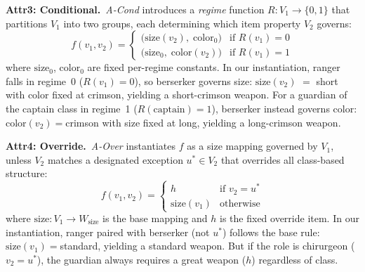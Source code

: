 \documentclass[11pt]{article}
\newcommand\jl[1]{\todo[color=blue!40]{{\bf Jessy}: #1}}
\begin{document}
\noindent\textbf{Attr3: Conditional.}~\textit{A-Cond} introduces a \emph{regime} function $R{:}V_1{\to}\{0,1\}$ that partitions $V_1$ into two groups, each determining which item property $V_2$ governs:
\[ f(v_1, v_2) = \begin{cases} \bigl(\text{size}(v_2),\;\text{color}_0\bigr) & \text{if } R(v_1)=0 \\ \bigl(\text{size}_0,\;\text{color}(v_2)\bigr) & \text{if } R(v_1)=1 \end{cases} \]
where $\text{size}_0$, $\text{color}_0$ are fixed per-regime constants. In our instantiation, ranger falls in regime~0 ($R(v_1){=}0$), so berserker governs size: $\text{size}(v_2)$ ${=}$ short with color fixed at crimson, yielding a short-crimson weapon. For a guardian of the captain class in regime~1 ($R(\text{captain}){=}1$), berserker instead governs color: $\text{color}(v_2){=}$crimson with size fixed at long, yielding a long-crimson weapon.


\noindent\textbf{Attr4: Override.}~\textit{A-Over} instantiates $f$ as a size mapping governed by $V_1$, unless $V_2$ matches a designated exception $u^* \in V_2$ that overrides all class-based structure:
\[ f(v_1, v_2) = \begin{cases} h & \text{if } v_2 = u^* \\ \text{size}(v_1) & \text{otherwise} \end{cases} \]
where $\text{size}{:}V_1{\to}W_\text{size}$ is the base mapping and $h$ is the fixed override item. In our instantiation, ranger paired with berserker (not $u^*$) follows the base rule: $\text{size}(v_1){=}$standard, yielding a standard weapon. But if the role is chirurgeon ($v_2{=}u^*$), the guardian always requires a great weapon ($h$) regardless of class.%
\end{document}
